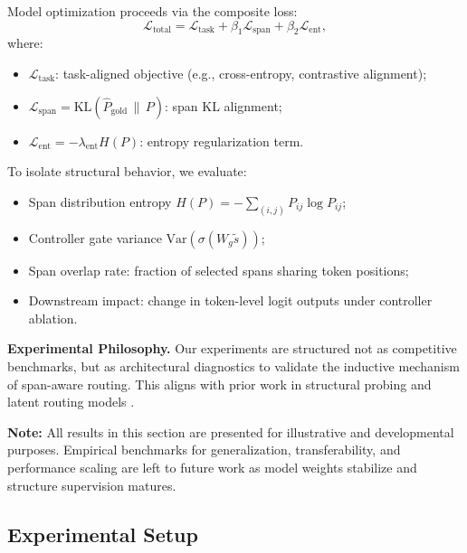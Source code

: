 Model optimization proceeds via the composite loss:
\begin{equation}
\mathcal{L}_{\text{total}} = \mathcal{L}_{\text{task}} + \beta_1 \mathcal{L}_{\text{span}} + \beta_2 \mathcal{L}_{\text{ent}},
\label{eq:exp_loss_summary}
\end{equation}
where:
\begin{itemize}[leftmargin=1.8em]
    \item \(\mathcal{L}_{\text{task}}\): task-aligned objective (e.g., cross-entropy, contrastive alignment);
    \item \(\mathcal{L}_{\text{span}} = \mathrm{KL}(\hat{P}_{\text{gold}} \,\|\, P)\): span KL alignment;
    \item \(\mathcal{L}_{\text{ent}} = - \lambda_{\text{ent}} H(P)\): entropy regularization term.
\end{itemize}

To isolate structural behavior, we evaluate:
\begin{itemize}
  \item Span distribution entropy \(H(P) = -\sum_{(i,j)} P_{ij} \log P_{ij}\);
  \item Controller gate variance \(\mathrm{Var}(\sigma(W_g \tilde{s}))\);
  \item Span overlap rate: fraction of selected spans sharing token positions;
  \item Downstream impact: change in token-level logit outputs under controller ablation.
\end{itemize}

\vspace{0.5em}
\noindent\textbf{Experimental Philosophy.}
Our experiments are structured not as competitive benchmarks, but as architectural diagnostics to validate the inductive mechanism of span-aware routing. This aligns with prior work in structural probing and latent routing models \cite{gupta2022molt, tay2020sparse, clark2018semi}.

\vspace{0.75em}
\textbf{Note:} All results in this section are presented for illustrative and developmental purposes. Empirical benchmarks for generalization, transferability, and performance scaling are left to future work as model weights stabilize and structure supervision matures.

\subsection{Experimental Setup}
\label{sec:experimental-setup}

